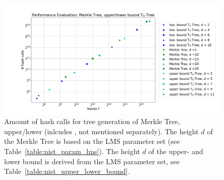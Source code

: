 \begin{figure}
\centering
\includegraphics[width=\linewidth]{images/Evaluation/performance_tree_generation.png}
\caption{Amount of hash calls for tree generation of Merkle Tree, upper/lower \tftree (inlcudes \extree, not mentioned separately). The height $d$ of the Merkle Tree is based on the LMS parameter set (see Table~\ref{table:nist_param_lms}). The height $d$ of the upper- and lower bound \tftree is derived from the LMS parameter set, see Table~\ref{table:nist_upper_lower_bound}.}
\label{img:performance_tree_gen}
\end{figure}

